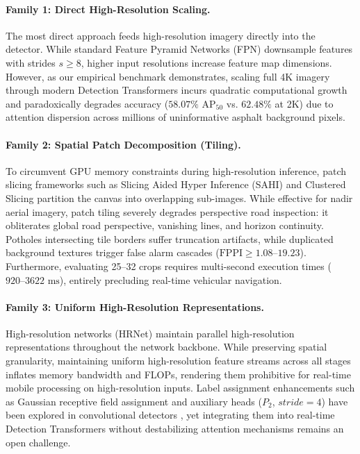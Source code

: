 \documentclass[runningheads]{llncs}
\begin{document}
\paragraph{Family 1: Direct High-Resolution Scaling.} The most direct approach feeds high-resolution imagery directly into the detector. While standard Feature Pyramid Networks (FPN) \cite{lin2017feature} downsample features with strides $s \ge 8$, higher input resolutions increase feature map dimensions. However, as our empirical benchmark demonstrates, scaling full 4K imagery through modern Detection Transformers incurs quadratic computational growth and paradoxically degrades accuracy ($58.07\% \text{ AP}_{50}$ vs. $62.48\%$ at 2K) due to attention dispersion across millions of uninformative asphalt background pixels.

\paragraph{Family 2: Spatial Patch Decomposition (Tiling).} To circumvent GPU memory constraints during high-resolution inference, patch slicing frameworks such as Slicing Aided Hyper Inference (SAHI) \cite{akyon2022sahi} and Clustered Slicing \cite{yang2019clustered} partition the canvas into overlapping sub-images. While effective for nadir aerial imagery, patch tiling severely degrades perspective road inspection: it obliterates global road perspective, vanishing lines, and horizon continuity. Potholes intersecting tile borders suffer truncation artifacts, while duplicated background textures trigger false alarm cascades ($\text{FPPI} \ge 1.08\text{--}19.23$). Furthermore, evaluating 25--32 crops requires multi-second execution times ($920\text{--}3622\text{ ms}$), entirely precluding real-time vehicular navigation.

\paragraph{Family 3: Uniform High-Resolution Representations.} High-resolution networks (HRNet) \cite{wang2021high} maintain parallel high-resolution representations throughout the network backbone. While preserving spatial granularity, maintaining uniform high-resolution feature streams across all stages inflates memory bandwidth and FLOPs, rendering them prohibitive for real-time mobile processing on high-resolution inputs. Label assignment enhancements such as Gaussian receptive field assignment \cite{li2022rfla} and auxiliary heads ($P_2$, $stride=4$) have been explored in convolutional detectors \cite{bochkovskiy2020yolov4}, yet integrating them into real-time Detection Transformers without destabilizing attention mechanisms remains an open challenge.
\end{document}
